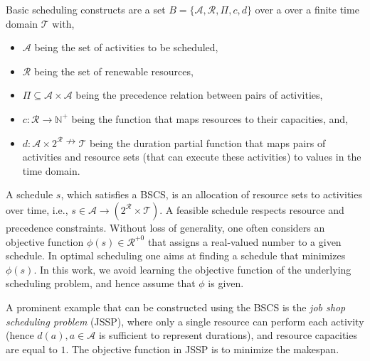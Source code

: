 \begin{mydef}  \label{def:sched}
Basic scheduling constructs are a set $B = \{ \mathcal{A}, \mathcal{R}, \varPi, c, d \}$ over a 
	over a finite time domain $\mathcal{T}$
	with,
	\begin{itemize}
		
		\item $\mathcal{A}$ being the set of activities to be scheduled,
		\item $\mathcal{R}$ being the set of renewable resources,
		\item $\varPi \subseteq \mathcal{A} \times \mathcal{A}$ being the precedence relation between pairs of activities,
		\item $c: \mathcal{R} \rightarrow  \mathbb{N}^{+}$ being the function that maps resources to their capacities, and, 
		\item $d: \mathcal{A} \times 2^{\mathcal{R}} \nrightarrow \mathcal{T}$ being the duration partial function that maps pairs of activities and resource sets (that can execute these activities) to values in the time domain.
	\end{itemize}
\end{mydef} \noindent A schedule $s$, which satisfies
a BSCS, is an allocation of resource sets to 
activities over time, i.e., 
$s \in \mathcal{A} \rightarrow  (2^\mathcal{R} \times \mathcal{T})$. A feasible schedule respects 
resource and precedence constraints. 
Without loss of generality, one often considers an objective function 
$\phi(s) \in \mathcal{R}^{+0}$ that 
assigns a real-valued number to a 
given schedule. In optimal scheduling one aims at finding a 
schedule that minimizes 
$\phi(s)$. In this work, we avoid learning
the objective function of the underlying scheduling problem, and hence assume that $\phi$ is given.

A prominent example that can be constructed using the BSCS is the \emph{job shop scheduling problem} (JSSP),
where only a single resource can perform each activity (hence $d(a) , a \in \mathcal{A}$ is sufficient to represent durations),
and resource capacities are equal to $1$. The objective function in
JSSP is to minimize the makespan.

